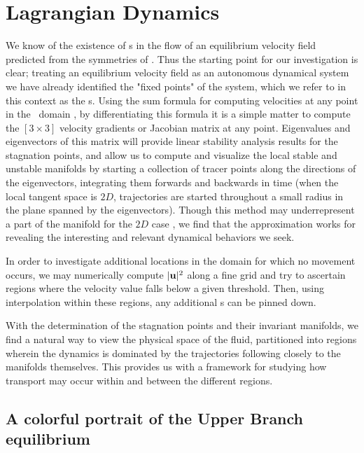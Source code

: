 \documentclass[letter,12pt,openany]{article}
\begin{document}
 
 



\section{\centering Lagrangian Dynamics}
\label{sec:Lagrangian}


We know of the existence of  \stagp s in the flow of an equilibrium velocity field
predicted from the symmetries of \pCf. Thus the starting point for our investigation is clear; treating an equilibrium velocity field as an autonomous dynamical system we have already identified the "fixed points" of the system, which we refer to in this context as the \stagp s.  Using the sum formula for computing velocities at
any point in the \pCf\ domain , by differentiating this formula it is a simple
matter to compute the $[3\!\times\! 3]$ velocity gradients or Jacobian matrix
at any point. Eigenvalues and eigenvectors of this matrix will
provide linear stability analysis results for the stagnation points, and allow us to compute and visualize the local stable
and unstable manifolds by starting a collection of tracer points along the directions of the eigenvectors, integrating them forwards and backwards in time (when the local tangent space is $2D$, trajectories are started throughout a small radius in the plane spanned by the eigenvectors). Though this method may underrepresent a part of the manifold for the $2D$ case \cite{numerical_approx}, we find that the approximation works for revealing the interesting and relevant dynamical behaviors we seek.


 In order to investigate additional locations in the domain for which no movement occurs, we may numerically compute $|{\bf u}|^{2}$ along a fine
grid and try to ascertain regions where the velocity value falls below a given threshold. Then,
using interpolation within these regions, any additional  \stagp s can be
pinned down. 

With the determination of the stagnation points and their invariant manifolds, we find a natural way to view the physical space of the fluid, partitioned into regions wherein the dynamics is dominated by the trajectories following closely to the manifolds themselves. This provides us with a framework for studying how transport may occur within and between the different regions.






\subsection{A colorful portrait of the Upper Branch equilibrium}
\label{sec:eq2}
\end{document}
